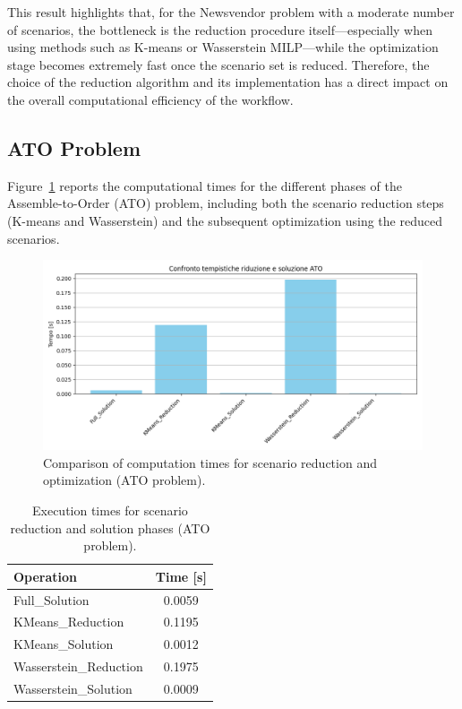 \documentclass[a4paper,12pt]{article}
\begin{document}
	This result highlights that, for the Newsvendor problem with a moderate number of scenarios, the bottleneck is the reduction procedure itself—especially when using methods such as K-means or Wasserstein MILP—while the optimization stage becomes extremely fast once the scenario set is reduced. Therefore, the choice of the reduction algorithm and its implementation has a direct impact on the overall computational efficiency of the workflow.
	\newpage
	\subsection{ATO Problem}
	
	Figure~\ref{fig:timing-ato} reports the computational times for the different phases of the Assemble-to-Order (ATO) problem, including both the scenario reduction steps (K-means and Wasserstein) and the subsequent optimization using the reduced scenarios.
	
	\begin{figure}[htbp]
		\centering
		\includegraphics[width=1\textwidth]{../immagini/tempiATO.png}
		\caption{Comparison of computation times for scenario reduction and optimization (ATO problem).}
		\label{fig:timing-ato}
	\end{figure}
	
	\begin{table}[htbp]
		\centering
		\caption{Execution times for scenario reduction and solution phases (ATO problem).}
		\begin{tabular}{lc}
			\hline
			\textbf{Operation} & \textbf{Time [s]} \\
			\hline
			Full\_Solution         & 0.0059 \\
			KMeans\_Reduction      & 0.1195 \\
			KMeans\_Solution       & 0.0012 \\
			Wasserstein\_Reduction & 0.1975 \\
			Wasserstein\_Solution  & 0.0009 \\
			\hline
		\end{tabular}
		\label{tab:timing-ato}
	\end{table}
	
\end{document}
